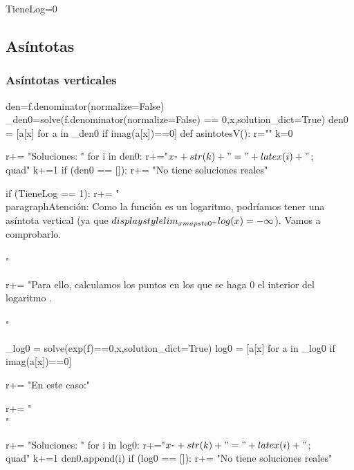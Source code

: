 \begin{sagesilent}
TieneLog=0
\end{sagesilent}




\subsection{Asíntotas}
\subsubsection{Asíntotas verticales}

\begin{sagesilent}
den=f.denominator(normalize=False)
_den0=solve(f.denominator(normalize=False) == 0,x,solution_dict=True)
den0 = [a[x] for a in _den0 if imag(a[x])==0]
def asintotesV():
    r=""
    k=0

    r+= "Soluciones: "
    for i in den0:
        r+="$x_"+str(k)+"="+latex(i)+" $;\\quad"
        k+=1
    if (den0 == []):
        r+= "No tiene soluciones reales"

    if (TieneLog == 1):
        r+= "\\paragraph{Atención: } Como la función es un logaritmo, podríamos tener una asíntota vertical (ya que $\\displaystyle\\lim_{x\\mapsto 0^+} \\log(x) = -\infty$). Vamos a comprobarlo.\\\\"
        
        r+= "Para ello, calculamos los puntos en los que se haga 0 el interior del logaritmo .\\\\"

        _log0 = solve(exp(f)==0,x,solution_dict=True)
        log0 = [a[x] for a in _log0 if imag(a[x])==0]  

        r+= "En este caso:"

        r+= "\\[ "+latex(exp(f))+"= 0 \\]"

        r+= "Soluciones: "
        for i in log0:
            r+="$x_"+str(k)+"="+latex(i)+" $;\\quad"
            k+=1
            den0.append(i)
        if (log0 == []):
            r+= "No tiene soluciones reales"


\end{sagesilent}
